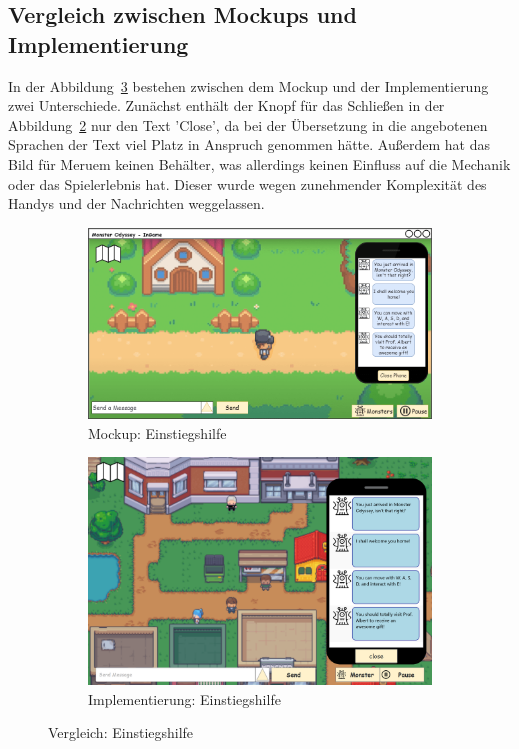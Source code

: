 \subsection{Vergleich zwischen Mockups und Implementierung}\label{subsec:vergleich-zwischen-mockups-und-implementierung-handy-help}
In der Abbildung~\ref{fig: Vergleich: Einstiegshilfe} bestehen zwischen dem Mockup und der Implementierung zwei Unterschiede. Zunächst enthält der Knopf für das Schließen in der Abbildung~\ref{fig: Implementierung: Einstiegshilfe} nur den Text 'Close', da bei der Übersetzung in die angebotenen Sprachen der Text viel Platz in Anspruch genommen hätte. Außerdem hat das Bild für Meruem keinen Behälter, was allerdings keinen Einfluss auf die Mechanik oder das Spielerlebnis hat. Dieser wurde wegen zunehmender Komplexität des Handys und der Nachrichten weggelassen.
\begin{figure}[H]
    \centering
    \begin{subfigure}[b]{0.4\textwidth}
        \includegraphics[width=\textwidth]{images/mockups/Bonusfeatures/Helpsituation/PlayerAndPlayerIngameFourthNotification.png}
        \caption{Mockup: Einstiegshilfe}
        \label{fig: Mockup: Einstiegshilfe}
    \end{subfigure}
    \hfill
    \begin{subfigure}[b]{0.4\textwidth}
        \includegraphics[width=\textwidth]{images/implementation/Bonusfeatures/Helpsituation/FirstMessagesImp.png}
        \caption{Implementierung: Einstiegshilfe}
        \label{fig: Implementierung: Einstiegshilfe}
    \end{subfigure}
    \caption{Vergleich: Einstiegshilfe}
    \label{fig: Vergleich: Einstiegshilfe}
\end{figure}
